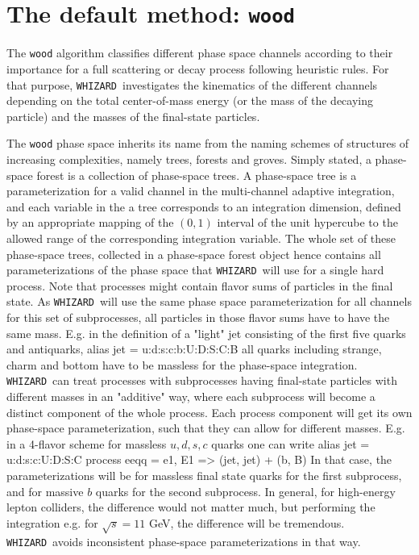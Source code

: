 \documentclass[12pt]{book}
\newenvironment{code}%
  {\begingroup\footnotesize
   \quote
   \Verbatim}%
  {\endVerbatim
   \endquote
   \endgroup\noindent}
\newcommand{\ttt}[1]{\texttt{#1}}
\newcommand{\whizard}{\ttt{WHIZARD}}
\begin{document}

\section{The default method: \ttt{wood}}
\label{sec:wood}

The \ttt{wood} algorithm classifies different phase space channels
according to their importance for a full scattering or decay process
following heuristic rules. For that purpose, \whizard\ investigates
the kinematics of the different channels depending on the total
center-of-mass energy (or the mass of the decaying particle) and the
masses of the final-state particles.

The \ttt{wood} phase space inherits its name from the naming schemes
of structures of increasing complexities, namely trees, forests and
groves. Simply stated, a phase-space forest is a collection of
phase-space trees. A phase-space tree is a parameterization for a
valid channel in the multi-channel adaptive integration, and each
variable in the a tree corresponds to an integration dimension,
defined by an appropriate mapping of the $(0,1)$ interval of the unit
hypercube to the allowed range of the corresponding integration
variable. The whole set of these phase-space trees, collected in a
phase-space forest object hence contains all parameterizations of the
phase space that \whizard\ will use for a single hard process. Note
that processes might contain flavor sums of particles in the final
state. As \whizard\ will use the same phase space parameterization for
all channels for this set of subprocesses, all particles in those
flavor sums have to have the same mass. E.g. in the definition of a
"light" jet consisting of the first five quarks and antiquarks,
\begin{code}
  alias jet = u:d:s:c:b:U:D:S:C:B
\end{code}
all quarks including strange, charm and bottom have to be massless for
the phase-space integration. \whizard\ can treat processes with
subprocesses having final-state particles with different masses in an
"additive" way, where each subprocess will become a distinct component
of the whole process. Each process component will get its own
phase-space parameterization, such that they can allow for different
masses. E.g. in a 4-flavor scheme for massless $u,d,s,c$ quarks one
can write
\begin{code}
  alias jet = u:d:s:c:U:D:S:C
  process eeqq = e1, E1 => (jet, jet) + (b, B)
\end{code}
In that case, the parameterizations will be for massless final state
quarks for the first subprocess, and for massive $b$ quarks for the
second subprocess. In general, for high-energy lepton colliders, the
difference would not matter much, but performing the integration
e.g. for $\sqrt{s} = 11$ GeV, the difference will be
tremendous. \whizard\ avoids inconsistent phase-space
parameterizations in that way.
\end{document}
